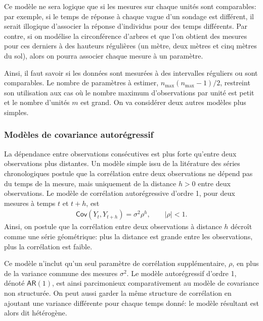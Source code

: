 \documentclass[
  11pt,
  letterpaper,
]{article}
\theoremstyle{definition}
\theoremstyle{definition}
\theoremstyle{definition}
\theoremstyle{definition}
\theoremstyle{remark}
\begin{document}
Ce modèle ne sera logique que si les mesures sur chaque unités sont comparables: par exemple, si le temps de réponse à chaque vague d'un sondage est différent, il serait illogique d'associer la réponse d'individus pour des temps différents. Par contre, si on modélise la circonférence d'arbres et que l'on obtient des mesures pour ces derniers à des hauteurs régulières (un mètre, deux mètres et cinq mètres du sol), alors on pourra associer chaque mesure à un paramètre.

Ainsi, il faut savoir si les données sont mesurées à des intervalles réguliers ou sont comparables. Le nombre de paramètres à estimer, \(n_{\max} (n_{\max} - 1)/2\), restreint son utilisation aux cas
où le nombre maximum d'observations par unité est petit et le nombre d'unités \(m\) est grand. On va considérer deux autres modèles plus simples.

\hypertarget{moduxe8les-de-covariance-autoruxe9gressif}{%
\subsubsection{Modèles de covariance autorégressif}\label{moduxe8les-de-covariance-autoruxe9gressif}}

La dépendance entre observations consécutives est plus forte qu'entre deux observations plus distantes. Un modèle simple issu de la litérature des séries chronologiques postule que la corrélation entre deux observations ne dépend pas du temps de la mesure, mais uniquement de la distance \(h>0\) entre deux observations. Le modèle de corrélation autorégressive d'ordre 1, pour deux mesures à temps \(t\) et \(t+h\), est
\begin{align*}
\mathsf{Cov}(Y_{t}, Y_{t+h}) = \sigma^2\rho^h, \qquad  |\rho| < 1.
\end{align*}
Ainsi, on postule que la corrélation entre deux observations à distance \(h\) décroît comme une série géométrique: plus la distance est grande entre les observations, plus la corrélation est faible.

Ce modèle n'inclut qu'un seul paramètre de corrélation supplémentaire, \(\rho\), en plus de la variance commune des mesures \(\sigma^2\). Le modèle autorégressif d'ordre 1, dénoté \(\mathsf{AR}(1)\), est ainsi parcimonieux comparativement au modèle de covariance non structurée. On peut aussi garder la même structure de corrélation en ajoutant une variance différente pour chaque temps donné: le modèle résultant est alors dit hétérogène.
\end{document}

